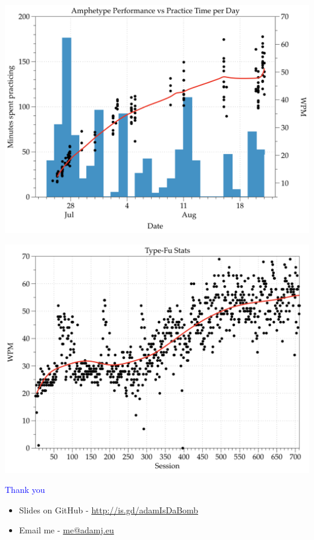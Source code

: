 \documentclass[landscape]{slides}
\begin{document}
\begin{slide}

    \includegraphics[width=\textwidth]{amphetype}

\end{slide}


\begin{slide}

    \includegraphics[width=\textwidth]{type-fu}

\end{slide}


\begin{slide}
    \textcolor{blue}{\Large{Thank you}}

    \begin{itemize}
        \item Slides on GitHub - \url{http://is.gd/adamIsDaBomb}
        \item Email me - \url{me@adamj.eu}
    \end{itemize}

\end{slide}
\end{document}
